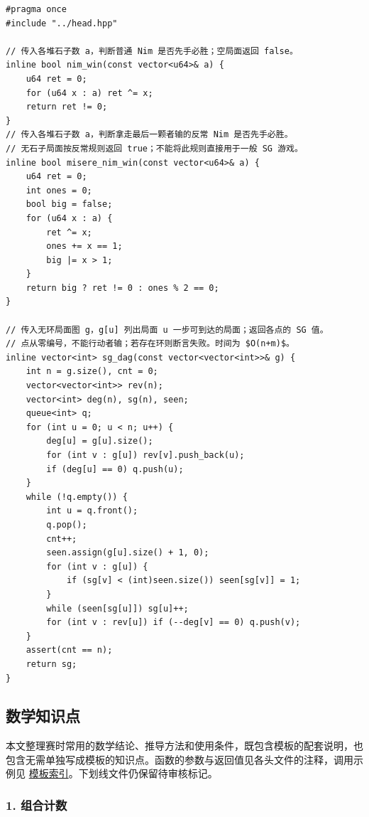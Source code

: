 \begin{lstlisting}
#pragma once
#include "../head.hpp"

// 传入各堆石子数 a，判断普通 Nim 是否先手必胜；空局面返回 false。
inline bool nim_win(const vector<u64>& a) {
    u64 ret = 0;
    for (u64 x : a) ret ^= x;
    return ret != 0;
}
// 传入各堆石子数 a，判断拿走最后一颗者输的反常 Nim 是否先手必胜。
// 无石子局面按反常规则返回 true；不能将此规则直接用于一般 SG 游戏。
inline bool misere_nim_win(const vector<u64>& a) {
    u64 ret = 0;
    int ones = 0;
    bool big = false;
    for (u64 x : a) {
        ret ^= x;
        ones += x == 1;
        big |= x > 1;
    }
    return big ? ret != 0 : ones % 2 == 0;
}

// 传入无环局面图 g，g[u] 列出局面 u 一步可到达的局面；返回各点的 SG 值。
// 点从零编号，不能行动者输；若存在环则断言失败。时间为 $O(n+m)$。
inline vector<int> sg_dag(const vector<vector<int>>& g) {
    int n = g.size(), cnt = 0;
    vector<vector<int>> rev(n);
    vector<int> deg(n), sg(n), seen;
    queue<int> q;
    for (int u = 0; u < n; u++) {
        deg[u] = g[u].size();
        for (int v : g[u]) rev[v].push_back(u);
        if (deg[u] == 0) q.push(u);
    }
    while (!q.empty()) {
        int u = q.front();
        q.pop();
        cnt++;
        seen.assign(g[u].size() + 1, 0);
        for (int v : g[u]) {
            if (sg[v] < (int)seen.size()) seen[sg[v]] = 1;
        }
        while (seen[sg[u]]) sg[u]++;
        for (int v : rev[u]) if (--deg[v] == 0) q.push(v);
    }
    assert(cnt == n);
    return sg;
}
\end{lstlisting}


\providecommand{\tightlist}{\setlength{\itemsep}{0pt}\setlength{\parskip}{0pt}}
\providecommand{\passthrough}[1]{#1}
\hypertarget{ux6570ux5b66ux77e5ux8bc6ux70b9}{%
\subsection{数学知识点}\label{ux6570ux5b66ux77e5ux8bc6ux70b9}}

本文整理赛时常用的数学结论、推导方法和使用条件，既包含模板的配套说明，也包含无需单独写成模板的知识点。函数的参数与返回值见各头文件的注释，调用示例见 \href{_templates.md}{模板索引}。下划线文件仍保留待审核标记。

\hypertarget{ux7ec4ux5408ux8ba1ux6570}{%
\subsubsection{1. 组合计数}\label{ux7ec4ux5408ux8ba1ux6570}}

